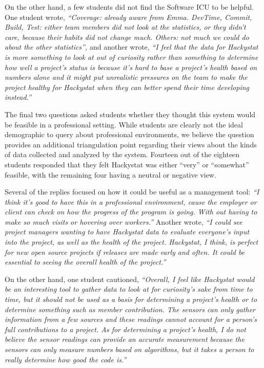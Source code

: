\documentclass[times,10pt,twocolumn]{article}
\begin{document}
On the other hand, a few students did not find the Software ICU to be
helpful.  One student wrote, {\em ``Coverage: already aware from
Emma. DevTime, Commit, Build, Test: either team members did not look at the
statistics, or they didn't care, because their habits did not change
much. Others: not much we could do about the other statistics'',} and
another wrote, {\em ``I feel that the data for Hackystat is more something
to look at out of curiosity rather than something to determine how well a
project's status is because it's hard to base a project's health based on
numbers alone and it might put unrealistic pressures on the team to make
the project healthy for Hackystat when they can better spend their time
developing instead.''}


The final two questions asked students whether they thought this system
would be feasible in a professional setting.  While students are clearly
not the ideal demographic to query about professional environments, we
believe the question provides an additional triangulation point regarding
their views about the kinds of data collected and analyzed by the system.
Fourteen out of the eighteen students responded that they felt Hackystat
was either ``very'' or ``somewhat'' feasible, with the remaining four
having a neutral or negative view.

Several of the replies focused on how it could be useful as a management
tool: {\em ``I think it's good to have this in a professional environment,
cause the employer or client can check on how the progress of the program
is going. With out having to make so much visits or hovering over
workers.''} Another wrote, {\em ``I could see project managers wanting to
have Hackystat data to evaluate everyone's input into the project, as well
as the health of the project. Hackystat, I think, is perfect for new open
source projects if releases are made early and often. It could be essential
to seeing the overall health of the project.''}

On the other hand, one student cautioned, {\em ``Overall, I feel like
Hackystat would be an interesting tool to gather data to look at for
curiosity's sake from time to time, but it should not be used as a basis
for determining a project's health or to determine something such as member
contribution. The sensors can only gather information from a few sources
and these readings cannot account for a person's full contributions to a
project. As for determining a project's health, I do not believe the sensor
readings can provide an accurate measurement because the sensors can only
measure numbers based on algorithms, but it takes a person to really
determine how good the code is.''}
\end{document}
